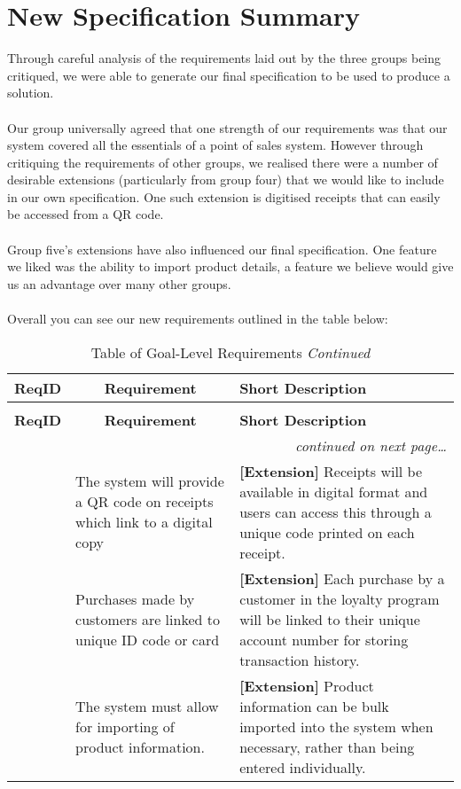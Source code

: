 \documentclass[a4paper]{article}
\begin{document}
\section{New Specification Summary}
Through careful analysis of the requirements laid out by the three groups being critiqued, we were able to generate our final specification to be used to produce a solution.
\\\\
Our group universally agreed that one strength of our requirements was that our system covered all the essentials of a point of sales system. However through critiquing the requirements of other groups, we realised there were a number of desirable extensions (particularly from group four) that we would like to include in our own specification. One such extension is digitised receipts that can easily be accessed from a QR code. 
\\\\
Group five’s extensions have also influenced our final specification. One feature we liked was the ability to import product details, a feature we believe would give us an advantage over many other groups.
\\\\
Overall you can see our new requirements outlined in the table below:
\begin{longtable}{|l|p{5cm}|p{8cm}|}
  \caption{Table of New Specification Requirements}\\
  \hline
  \multicolumn{1}{|c|}{\textbf{ReqID}}  &
  \multicolumn{1}{|c|}{\textbf{Requirement}} &
  \textbf{Short Description}\\
  \hline\hline
  \endfirsthead
  \caption[]{Table of Goal-Level Requirements \textit{Continued}}\\
  \hline
  \multicolumn{1}{|c|}{\textbf{ReqID}} &
  \multicolumn{1}{|c|}{\textbf{Requirement}} &
  \textbf{Short Description}\\
  \hline\hline
  \endhead
  \hline
  \multicolumn{3}{r}{\textit{continued on next page\ldots}}\\
  \endfoot
  \hline
  \endlastfoot
  \textcolor{blue}{}  &  The system will provide a QR code on receipts which link to a digital copy     & \textbf{[Extension] }Receipts will be available in digital format and users can access this through a unique code printed on each receipt.\\
  \hline
 \textcolor{blue}{ }  &  Purchases made by customers are linked to unique ID code or card & \textbf{[Extension] }Each purchase by a customer in the loyalty program will be linked to their unique account number for storing transaction history. \\
  \hline
  \textcolor{blue}{}  & The system must allow for importing of product information. & \textbf{[Extension] }Product information can be bulk imported into the system when necessary, rather than being entered individually.\\
  \hline
 
\end{longtable}
\end{document}
